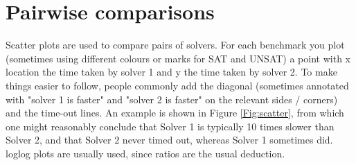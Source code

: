 \documentclass{easychair}
\begin{document}
\section{Pairwise comparisons}
Scatter plots are used to compare pairs of solvers.  For each benchmark you plot (sometimes using different colours or marks for SAT and UNSAT) a point with x location the time taken by solver 1 and y the time taken by solver 2.  To make things easier to follow, people commonly add the diagonal (sometimes annotated with "solver 1 is faster"
and "solver 2 is faster" on the relevant sides / corners) and the time-out lines.
An example is shown in Figure \ref{Fig:scatter}, from which one might reasonably conclude that Solver 1 is typically 10 times slower than Solver 2, and that Solver 2 never timed out, whereas Solver 1 sometimes did.  loglog plots are usually used, since ratios are the usual deduction. 
\end{document}
